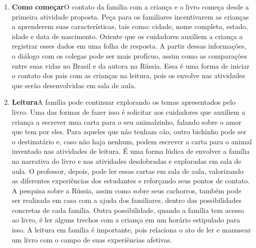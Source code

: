 \documentclass[11pt]{extarticle}
\begin{document}
\begin{enumerate}
\item \textbf{Como começar}\quad O contato da família com a criança e o livro começa desde a primeira atividade proposta. Peça para os familiares incentivarem as crianças a aprenderem suas características, tais como: cidade, nome completo, estado, idade e data de nascimento. Oriente que os cuidadores auxiliem a criança a registrar esses dados em uma folha de resposta. A partir dessas informações, o diálogo com os colegas pode ser mais profícuo, assim como as comparações entre suas vidas no Brasil e da autora na Rússia. Essa é uma forma de iniciar o contato dos pais com as crianças na leitura, pois os envolve nas atividades que serão desenvolvidas em sala de aula.


\item \textbf{Leitura}\quad A família pode continuar 
explorando os temas apresentados pelo livro. Uma das formas de fazer isso é solicitar aos cuidadores que auxiliem a criança a escrever uma carta para o seu animalzinho, falando sobre o amor que tem por eles. Para aqueles que não tenham cão, outro bichinho pode ser o destinatário e, caso não haja nenhum, podem escrever a carta para o animal inventado nas atividades de leitura. É uma forma lúdica de envolver a família na narrativa do livro e nas atividades desdobradas e exploradas em sala de aula. O professor, depois, pode ler essas cartas em sala de aula, valorizando as diferentes experiências dos estudantes e reforçando seus pontos de contato. A pesquisa sobre a Rússia, assim como sobre seus cachorros, também pode ser realizada em casa com a ajuda dos familiares, dentro das possibilidades concretas de cada família. Outra possibilidade, quando a família tem acesso ao livro, é ler alguns trechos com a criança em um horário estipulado para isso. A leitura em família é importante, pois relaciona o ato de ler e manusear um livro com o campo de suas experiências afetivas.


\end{enumerate}
\end{document}
